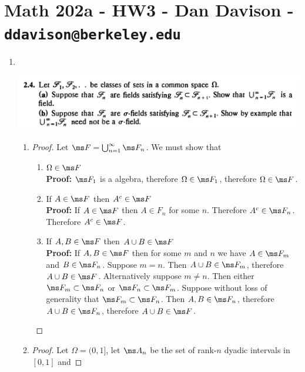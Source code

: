 \section*{Math 202a - HW3 - Dan Davison - \texttt{ddavison@berkeley.edu}}

\begin{enumerate}
\item~\\
  \begin{mdframed}
    \includegraphics[width=400pt]{img/analysis--berkeley-202a-hw-e32d.png}
  \end{mdframed}
  \begin{enumerate}[label=(\alph*)]
  \item
    \begin{proof}
      Let $\ms F = \bigcup_{n=1}^\infty \ms F_n$. We must show that
      \begin{enumerate}
      \item $\Omega \in \ms F$ \\
        {\bf Proof:} $\ms F_1$ is a algebra, therefore $\Omega \in \ms F_1$, therefore $\Omega \in \ms F$.
      \item If $A \in \ms F$ then $A^c \in \ms F$ \\
        {\bf Proof:} If $A \in \ms F$ then $A \in F_n$ for some $n$. Therefore $A^c \in \ms F_n$. Therefore $A^c \in \ms F$.
      \item If $A, B \in \ms F$ then $A \cup B \in \ms F$ \\
        {\bf Proof:} If $A, B \in \ms F$ then for some $m$ and $n$ we have $A \in \ms F_m$ and $B \in \ms F_n$.
        Suppose $m = n$. Then $A \cup B \in \ms F_m$, therefore $A \cup B \in \ms F$. Alternatively
        suppose $m \neq n$. Then either $\ms F_m \subset \ms F_n$ or $\ms F_n \subset \ms F_m$. Suppose without
        loss of generality that $\ms F_m \subset \ms F_n$. Then $A, B \in \ms F_n$,
        therefore $A \cup B \in \ms F_n$, therefore $A \cup B \in \ms F$.
      \end{enumerate}
    \end{proof}
  \item
    \begin{proof}
      Let $\Omega = (0, 1]$, let $\ms A_n$ be the set of rank-$n$ dyadic intervals in $[0, 1]$ and

\end{proof}
\end{enumerate}
\end{enumerate}
